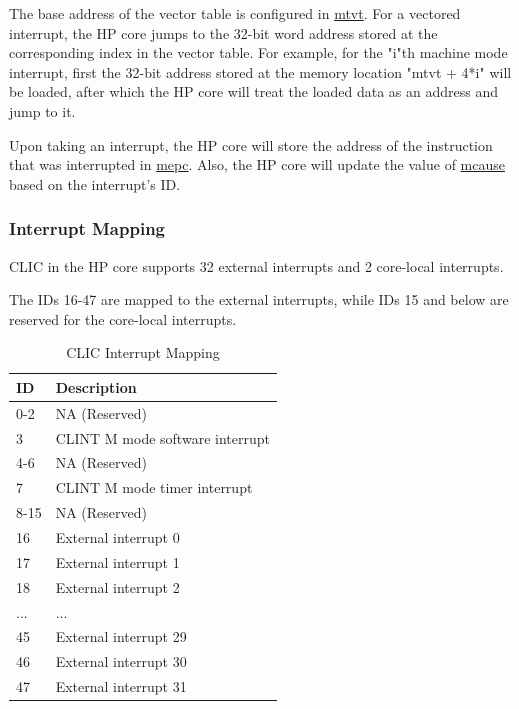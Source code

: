 \documentclass[main\_\_EN.tex]{subfiles}
\begin{document}
The base address of the vector table is configured in \hyperref[regdesc:MTVT]{mtvt}.
For a vectored interrupt, the HP core jumps to the 32-bit word address stored at the corresponding index in the vector table.
For example, for the "i"th machine mode interrupt, first the 32-bit address stored at the memory location "mtvt + 4*i" will be loaded, after which the HP core will treat the loaded data as an address and jump to it.

Upon taking an interrupt, the HP core will store the address of the instruction that was interrupted in \hyperref[regdesc:MEPC]{mepc}.
Also, the HP core will update the value of \hyperref[regdesc:MCAUSE]{mcause}
based on the interrupt's ID.


\hypertarget{riscvcpu-clic-intmap}{}
\subsubsection{Interrupt Mapping}
\label{sec:riscvcpu-clic-intmap}

CLIC in the HP core supports 32 external interrupts and 2 core-local interrupts.

The IDs 16-47 are mapped to the external interrupts, while IDs 15 and below are reserved for the core-local interrupts.

\begin{longtable}{ | l | l | }
\caption{CLIC Interrupt Mapping}
\label{tab:riscvcpu-clic-intmap-table}
\\ \hline
\rowcolor{lightgray}
ID & Description \\ \hline
0-2 & NA (Reserved) \\ \hline
3 & CLINT M mode software interrupt \\ \hline
4-6 & NA (Reserved) \\ \hline
7 & CLINT M mode timer interrupt \\ \hline
8-15 & NA (Reserved) \\ \hline
16 & External interrupt 0 \\ \hline
17 & External interrupt 1 \\ \hline
18 & External interrupt 2 \\ \hline
... & ... \\ \hline
45 & External interrupt 29 \\ \hline
46 & External interrupt 30 \\ \hline
47 & External interrupt 31 \\ \hline
\end{longtable}
\end{document}
